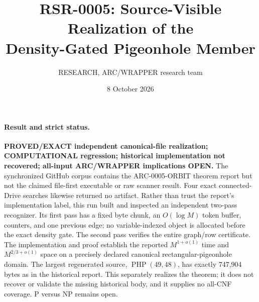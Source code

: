 \documentclass[11pt]{article}
\title{RSR-0005: Source-Visible Realization of the\\Density-Gated Pigeonhole Member}
\author{RESEARCH, ARC/WRAPPER research team}
\date{8 October 2026}
\begin{document}
\maketitle

\paragraph{Result and strict status.}
\textbf{PROVED/EXACT independent canonical-file realization;
COMPUTATIONAL regression; historical implementation not recovered;
all-input ARC/WRAPPER implications OPEN.}
The synchronized GitHub corpus contains the ARC-0005-ORBIT theorem report but
not the claimed file-first executable or raw scanner result.  Four exact
connected-Drive searches likewise returned no artifact.  Rather than trust
the report's implementation label, this run built and inspected an independent
two-pass recognizer.  Its first pass has a fixed byte chunk, an
$O(\log M)$ token buffer, counters, and one previous edge; no variable-indexed
object is allocated before the exact density gate.  The second pass verifies
the entire graph/row certificate.  The implementation and proof establish the
reported $M^{1+o(1)}$ time and $M^{2/3+o(1)}$ space on a precisely declared
canonical rectangular-pigeonhole domain.  The largest regenerated source,
$\operatorname{PHP}(49,48)$, has exactly 747,904 bytes as in the historical
report.  This separately realizes the theorem; it does not recover or validate
the missing historical body, and it supplies no all-CNF coverage.  P versus NP
remains open.
\end{document}
